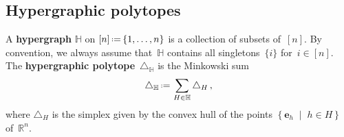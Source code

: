 \documentclass[reqno]{amsart}
\theoremstyle{definition}
\newtheorem{example}[theorem]{Example}
\newcommand{\R}{\mathbb{R}} %
\renewcommand{\b}[1]{\boldsymbol{#1}} %
\newcommand{\set}[2]{\left\{ #1 \;\middle|\; #2 \right\}} %
\newcommand{\eqdef}{\mbox{\,\raisebox{0.2ex}{\scriptsize\ensuremath{\mathrm:}}\ensuremath{=}\,}} %
\newcommand{\simplex}{\triangle} %
\newcommand{\blue}[1]{{\color{blue} #1}} %
\newcommand{\red}[1]{{\color{red} #1}} %
\newcommand{\defn}[1]{\textbf{\textsf{\color{PineGreen} #1}}} %
\newcommand{\vincent}[1]{\todo[size=\tiny,color=blue!30]{ #1 \\ \hfill --- V.}\,}
\newcommand{\HH}{\mathbb H}  %
\begin{document}

\subsection{Hypergraphic polytopes}
\label{subsec:D_H}

A \defn{hypergraph} $\HH$ on $[n] \eqdef \{1, \dots, n\}$ is a collection of  subsets of~$[n]$.
By convention, we always assume that~$\HH$ contains all singletons~$\{i\}$ for~$i\in [n]$.
The \defn{hypergraphic polytope}~$\simplex_\HH$ is the Minkowski sum
\[
\simplex_\HH \eqdef \sum_{H\in \HH} \simplex_H\,,
\]
where $\simplex_H$ is the simplex given by the convex hull of the points $\set{\b{e}_h}{h \in H}$ of~$\R^n$.

\end{document}
